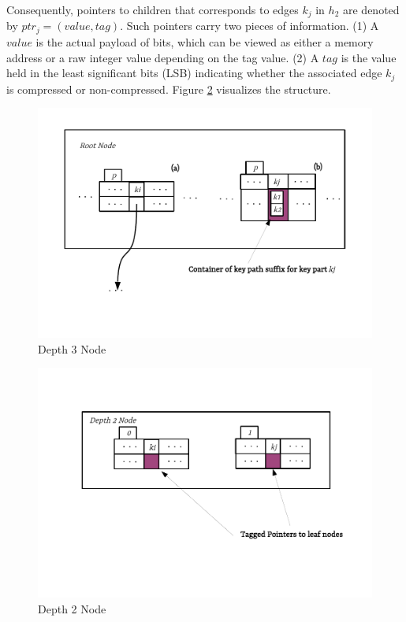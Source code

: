 Consequently, pointers to children that corresponds to edges $k_{j}$ in $h_2$ are denoted by $ptr_{j} = (value, tag)$. Such pointers carry two pieces of information. (1) A $value$ is the actual payload of bits, which can be viewed as either a memory address or a raw integer value depending on the tag value. (2) A $tag$ is the value held in the least significant bits (LSB) indicating whether the associated edge $k_{j}$ is compressed or non-compressed. Figure \ref{fig:compressed_depth_2_node} visualizes the structure.

\clearpage
\begin{figure}
	\centering
	\vspace{-0.3in}
	\includegraphics{figures/chapter4/depth3}
	\caption{Depth 3 Node}
	\label{fig:compressed_depth_3_node}
\end{figure}

\begin{figure}
	\centering
	\vspace{-1in}
	\includegraphics{figures/chapter4/depth2}
	\caption{Depth 2 Node}
	\label{fig:compressed_depth_2_node}
\end{figure}
\clearpage

